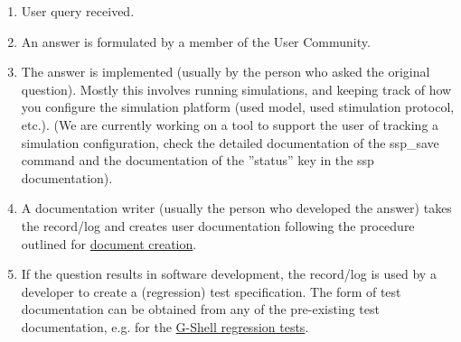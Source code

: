 \documentclass[12pt]{article}
\begin{document}
\begin{enumerate}
\item User query received.
\item An answer is formulated by a member of the User Community.
\item The answer is implemented (usually by the person who asked the
  original question).  Mostly this involves running simulations, and
  keeping track of how you configure the simulation platform (used
  model, used stimulation protocol, etc.).  (We are currently working
  on a tool to support the user of tracking a simulation
  configuration, check the detailed documentation of the ssp_save
  command and the documentation of the ''status'' key in the ssp
  documentation).
\item A documentation writer (usually the person who developed the
  answer) takes the record/log and creates user documentation
  following the procedure outlined for
  \href{../document-create/document-create.tex}{document creation}.
\item If the question results in software development, the record/log
  is used by a developer to create a (regression) test specification.
  The form of test documentation can be obtained from any of the
  pre-existing test documentation, e.g. for the
  \href{../tests-gshell/tests-gshell.tex}{G-Shell regression tests}.
\end{enumerate}
\end{document}
